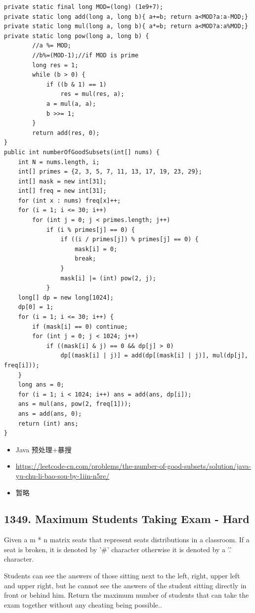 \documentclass[9pt, b5paper]{article}
\begin{document}
\begin{verbatim}
private static final long MOD=(long) (1e9+7);
private static long add(long a, long b){ a+=b; return a<MOD?a:a-MOD;}
private static long mul(long a, long b){ a*=b; return a<MOD?a:a%MOD;}
private static long pow(long a, long b) {
        //a %= MOD;
        //b%=(MOD-1);//if MOD is prime
        long res = 1;
        while (b > 0) {
            if ((b & 1) == 1)
                res = mul(res, a);
            a = mul(a, a);
            b >>= 1;
        }
        return add(res, 0);
}
public int numberOfGoodSubsets(int[] nums) {
    int N = nums.length, i;
    int[] primes = {2, 3, 5, 7, 11, 13, 17, 19, 23, 29};
    int[] mask = new int[31];
    int[] freq = new int[31];
    for (int x : nums) freq[x]++;
    for (i = 1; i <= 30; i++) 
        for (int j = 0; j < primes.length; j++) 
            if (i % primes[j] == 0) {
                if ((i / primes[j]) % primes[j] == 0) {
                    mask[i] = 0;
                    break;
                }
                mask[i] |= (int) pow(2, j);
            }
    long[] dp = new long[1024];
    dp[0] = 1;
    for (i = 1; i <= 30; i++) {
        if (mask[i] == 0) continue;
        for (int j = 0; j < 1024; j++) 
            if ((mask[i] & j) == 0 && dp[j] > 0)
                dp[(mask[i] | j)] = add(dp[(mask[i] | j)], mul(dp[j], freq[i]));
    }
    long ans = 0;
    for (i = 1; i < 1024; i++) ans = add(ans, dp[i]);
    ans = mul(ans, pow(2, freq[1]));
    ans = add(ans, 0);
    return (int) ans;
}
\end{verbatim}
\begin{itemize}
\item Java 预处理+暴搜
\item \url{https://leetcode-cn.com/problems/the-number-of-good-subsets/solution/java-yu-chu-li-bao-sou-by-1iin-n5re/}
\item 暂略
\end{itemize}

\subsection{1349. Maximum Students Taking Exam - Hard}
\label{sec-3-9}
Given a m * n matrix seats  that represent seats distributions in a classroom. If a seat is broken, it is denoted by '\#' character otherwise it is denoted by a '.' character.

Students can see the answers of those sitting next to the left, right, upper left and upper right, but he cannot see the answers of the student sitting directly in front or behind him. Return the maximum number of students that can take the exam together without any cheating being possible..
\end{document}
